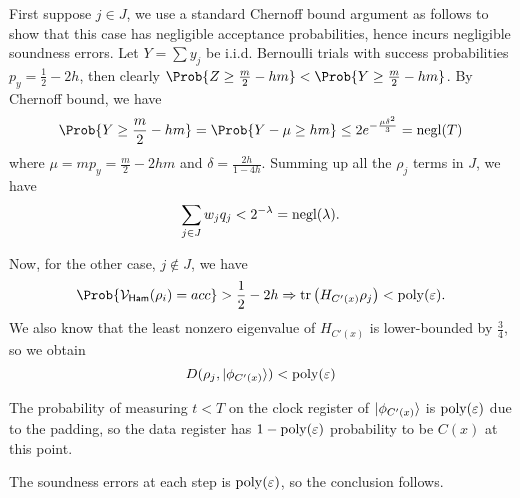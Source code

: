 \begin{prf}
	First suppose $j\in J$, we use a standard Chernoff bound argument as follows to show that this case has negligible acceptance probabilities,
	hence incurs negligible soundness errors.
	Let $Y=\sum y_j$ be i.i.d. Bernoulli trials with success probabilities $p_y=\frac{1}{2}-2h$,
	then clearly $\Prob{Z\geq\frac{m}{2}-hm}<\Prob{Y\geq\frac{m}{2}-hm}$.
	By Chernoff bound, we have
	$$\Prob{Y\geq\frac{m}{2}-hm}=\Prob{Y-\mu\geq hm}\leq2e^{-\frac{\mu\delta^2}{3}}=\negl(T)$$
	where $\mu=mp_y=\frac{m}{2}-2hm$ and $\delta=\frac{2h}{1-4h}$.
	Summing up all the $\rho_j$ terms in $J$, we have
	$$\sum_{j\in J} w_j q_j<2^{-\lambda}=\operatorname{negl}(\lambda).$$

	Now, for the other case, $j\notin J$, we have
	$$\Prob{\cV_\GS(\rho_i)=acc}>\frac{1}{2}-2h\Rightarrow\tr\left(H_{C'(x)}\rho_j\right)<\poly(\varepsilon).$$
	We also know that the least nonzero eigenvalue of $H_{C'(x)}$ is lower-bounded by $\frac{3}{4}$, so we obtain 
	$$D(\rho_j, \ket{\phi_{C'(x)}})<\operatorname*{\operatorname{poly}}(\varepsilon)$$

	The probability of measuring $t<T$ on the clock register of $\ket{\phi_{C'(x)}}$ is $\operatorname*{\operatorname{poly}}(\varepsilon)$ due to the padding,
	so the data register has $1-\operatorname*{\operatorname{poly}}(\varepsilon)$ probability to be $C(x)$ at this point.

	The soundness errors at each step is $\operatorname*{\operatorname{poly}}(\varepsilon)$, so the conclusion follows.
\end{prf}
